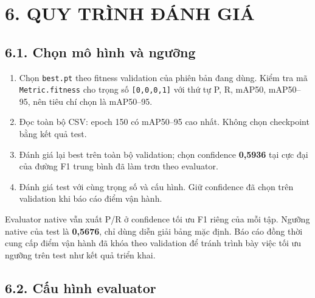 \documentclass[
  vietnamese,
  12pt,
  a4paper,
]{article}
\providecommand{\tightlist}{%
  \setlength{\itemsep}{0pt}\setlength{\parskip}{0pt}}
\begin{document}
\section{6. QUY TRÌNH ĐÁNH GIÁ}\label{quy-truxecnh-ux111uxe1nh-giuxe1}

\subsection{6.1. Chọn mô hình và
ngưỡng}\label{chux1ecdn-muxf4-huxecnh-vuxe0-ngux1b0ux1ee1ng}

\begin{enumerate}
\def\labelenumi{\arabic{enumi}.}
\tightlist
\item
  Chọn
  \texttt{b\allowbreak{}e\allowbreak{}s\allowbreak{}t\allowbreak{}.\allowbreak{}p\allowbreak{}t\allowbreak{}}
  theo fitness validation của phiên bản đang dùng. Kiểm tra mã
  \texttt{M\allowbreak{}e\allowbreak{}t\allowbreak{}r\allowbreak{}i\allowbreak{}c\allowbreak{}.\allowbreak{}f\allowbreak{}i\allowbreak{}t\allowbreak{}n\allowbreak{}e\allowbreak{}s\allowbreak{}s\allowbreak{}}
  cho trọng số
  \texttt{[\allowbreak{}0\allowbreak{},\allowbreak{}0\allowbreak{},\allowbreak{}0\allowbreak{},\allowbreak{}1\allowbreak{}]\allowbreak{}}
  với thứ tự P, R, mAP50, mAP50--95, nên tiêu chí chọn là mAP50--95.
\item
  Đọc toàn bộ CSV: epoch 150 có mAP50--95 cao nhất. Không chọn
  checkpoint bằng kết quả test.
\item
  Đánh giá lại best trên toàn bộ validation; chọn confidence
  \textbf{0,5936} tại cực đại của đường F1 trung bình đã làm trơn theo
  evaluator.
\item
  Đánh giá test với cùng trọng số và cấu hình. Giữ confidence đã chọn
  trên validation khi báo cáo điểm vận hành.
\end{enumerate}

Evaluator native vẫn xuất P/R ở confidence tối ưu F1 riêng của mỗi tập.
Ngưỡng native của test là \textbf{0,5676}, chỉ dùng diễn giải bảng mặc
định. Báo cáo đồng thời cung cấp điểm vận hành đã khóa theo validation
để tránh trình bày việc tối ưu ngưỡng trên test như kết quả triển khai.

\subsection{6.2. Cấu hình evaluator}\label{cux1ea5u-huxecnh-evaluator}

\begingroup\small\setlength{\tabcolsep}{4pt}\renewcommand{\arraystretch}{1.12}
\end{document}
